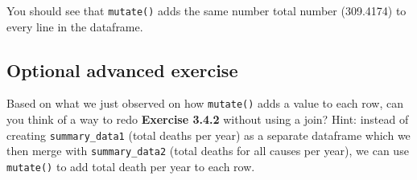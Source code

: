\documentclass[]{book}
\makeatletter
\newenvironment{Shaded}{\begin{snugshade}}{\end{snugshade}}
\newcommand{\KeywordTok}[1]{\textcolor[rgb]{0.13,0.29,0.53}{\textbf{#1}}}
\newcommand{\DataTypeTok}[1]{\textcolor[rgb]{0.13,0.29,0.53}{#1}}
\newcommand{\DecValTok}[1]{\textcolor[rgb]{0.00,0.00,0.81}{#1}}
\newcommand{\StringTok}[1]{\textcolor[rgb]{0.31,0.60,0.02}{#1}}
\newcommand{\OperatorTok}[1]{\textcolor[rgb]{0.81,0.36,0.00}{\textbf{#1}}}
\newcommand{\NormalTok}[1]{#1}
\newenvironment{kframe}{%
\medskip{}
\setlength{\fboxsep}{.8em}
 \def\at@end@of@kframe{}%
 \ifinner\ifhmode%
  \def\at@end@of@kframe{\end{minipage}}%
  \begin{minipage}{\columnwidth}%
 \fi\fi%
 \def\FrameCommand##1{\hskip\@totalleftmargin \hskip-\fboxsep
 \colorbox{shadecolor}{##1}\hskip-\fboxsep
     \hskip-\linewidth \hskip-\@totalleftmargin \hskip\columnwidth}%
 \MakeFramed {\advance\hsize-\width
   \@totalleftmargin\z@ \linewidth\hsize
   \@setminipage}}%
 {\par\unskip\endMakeFramed%
 \at@end@of@kframe}
\renewenvironment{Shaded}{\begin{kframe}}{\end{kframe}}
\makeatother
\begin{document}
\begin{Shaded}
\end{Shaded}

You should see that \texttt{mutate()} adds the same number total number
(309.4174) to every line in the dataframe.

\subsection{Optional advanced
exercise}\label{optional-advanced-exercise}

Based on what we just observed on how \texttt{mutate()} adds a value to
each row, can you think of a way to redo \textbf{Exercise 3.4.2} without
using a join? Hint: instead of creating \texttt{summary\_data1} (total
deaths per year) as a separate dataframe which we then merge with
\texttt{summary\_data2} (total deaths for all causes per year), we can
use \texttt{mutate()} to add total death per year to each row.

\begin{Shaded}
\end{Shaded}
\end{document}
